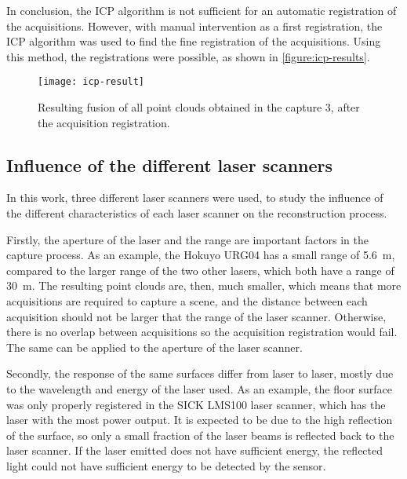 In conclusion, the ICP algorithm is not sufficient for an automatic registration of the acquisitions. However, with manual intervention as a first registration, the ICP algorithm was used to find the fine registration of the acquisitions. Using this method, the registrations were possible, as shown in \cref{figure:icp-results}.

\begin{figure}[h]
    
    \centering
    \texttt{[image: icp-result]}

    \caption{Resulting fusion of all point clouds obtained in the capture 3, after the acquisition registration.}
    \label{section:icp-result}

\end{figure}

\subsection{Influence of the different laser scanners}

In this work, three different laser scanners were used, to study the influence of the different characteristics of each laser scanner on the reconstruction process. 

Firstly, the aperture of the laser and the range are important factors in the capture process. As an example, the Hokuyo URG04 has a small range of \SI{5.6}{\meter}, compared to the larger range of the two other lasers, which both have a range of \SI{30}{\meter}. The resulting point clouds are, then, much smaller, which means that more acquisitions are required to capture a scene, and the distance between each acquisition should not be larger that the range of the laser scanner. Otherwise, there is no overlap between acquisitions so the acquisition registration would fail. The same can be applied to the aperture of the laser scanner. 

Secondly, the response of the same surfaces differ from laser to laser, mostly due to the wavelength and energy of the laser used. As an example, the floor surface was only properly registered in the SICK LMS100 laser scanner, which has the laser with the most power output. It is expected to be due to the high reflection of the surface, so only a small fraction of the laser beams is reflected back to the laser scanner. If the laser emitted does not have sufficient energy, the reflected light could not have sufficient energy to be detected by the sensor. 

